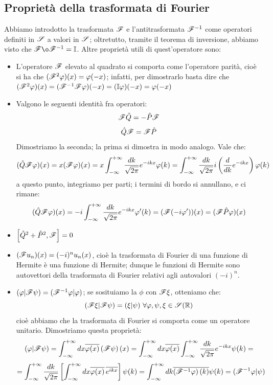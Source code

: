 \subsection{Proprietà della trasformata di Fourier}
Abbiamo introdotto la trasformata $\F$ e l'antitrasformata $\F^{-1}$ come operatori definiti in $\S$ a valori in $\S$; oltretutto, tramite il teorema di inversione, abbiamo visto che $\F \o \F^{-1}=\mathbb{I}$. Altre proprietà utili di quest'operatore sono:
\begin{itemize}
\item L'operatore $\F$ elevato al quadrato si comporta come l'operatore parità, cioè si ha che $(\F^2 \phi )(x)=\phi(-x)$; infatti, per dimostrarlo basta dire che $(\F^2 \phi )(x)=(\F^{-1} \F \phi)(-x)= (\mathbb{I} \phi)(-x)= \phi(-x)$
\item Valgono le seguenti identità fra operatori:
$$\F \hat{Q}=-\hat{P}\F$$
$$\hat{Q} \F= \F \hat{P}$$
Dimostriamo la seconda; la prima si dimostra in modo analogo. Vale che:
$$(\hat{Q} \F \phi)(x)=x(\F \phi)(x) = x \int_{-\infty}^{+\infty} \frac{dk}{\sqrt{2 \pi}}e^{-ikx} \phi(k)=  \int_{-\infty}^{+\infty} \frac{dk}{\sqrt{2 \pi}} i \left( \frac{d}{dk} e^{-ikx} \right) \phi(k)$$
a questo punto, integriamo per parti; i termini di bordo si annullano, e ci rimane:
$$(\hat{Q} \F \phi)(x)=-i \int_{-\infty}^{+\infty} \frac{dk}{\sqrt{2 \pi}}e^{-ikx} \phi'(k)=(\F (-i \phi'))(x)=(\F \hat{P} \phi)(x)$$
\item $\left[ \hat{Q}^2 + \hat{P}^2 , \F \right]=0$
\item $(\F u_n)(x)= (-i)^n u_n (x)$, cioè la trasformata di Fourier di una funzione di Hermite è una funzione di Hermite; dunque le funzioni di Hermite sono autovettori della trasformata di Fourier relativi agli autovalori $(-i)^n$. %
\item $(\phi|\F \psi)=(\F^{-1} \phi|\phi)$; se sosituiamo la $\phi$ con $\F \xi$, otteniamo che:
$$(\F \xi | \F \psi )=(\xi|\psi) \text{ } \forall \phi, \psi, \xi \in \S(\R)$$
cioè abbiamo che la trasformata di Fourier si comporta come un operatore unitario. Dimostriamo questa proprietà:
$$(\phi | \F \psi)= \int_{-\infty} ^{+\infty} dx \overline{\phi (x)} \left(\F \psi \right) (x)= \int_{-\infty} ^{+\infty} dx \overline{\phi (x)}  \int_{-\infty} ^{+\infty} \frac{dk}{\sqrt{2 \pi}} e^{-ikx} \psi(k)=$$
$$=\int_{-\infty} ^{+\infty} \frac{dk}{\sqrt{2 \pi}} \left[ \int_{-\infty} ^{+\infty} dx \overline{\phi (x)} \, \overline{e^{ikx}}  \right] \psi(k) =  \int_{-\infty} ^{+\infty} dk \overline{\left( \F^{-1} \phi \right) (k)} \psi(k)=(\F^{-1} \phi | \psi)$$

\end{itemize}
